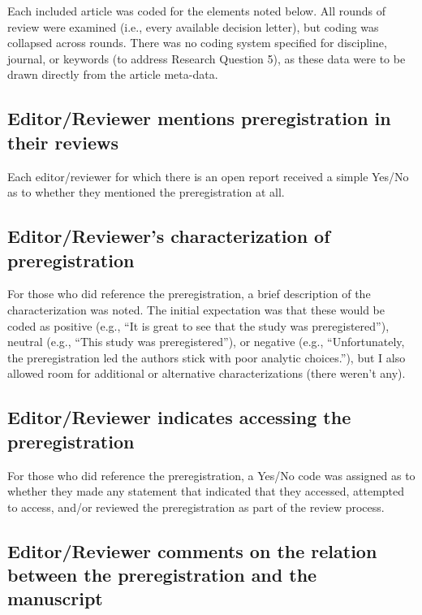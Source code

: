 \documentclass[authordate, empirical]{jote-new-article}
\begin{document}
	Each included article was coded for the elements noted below. All rounds of review were examined (i.e., every available decision letter), but coding was collapsed across rounds. There was no coding system specified for discipline, journal, or keywords (to address Research Question 5), as these data were to be drawn directly from the article meta-data.



	\subsection{Editor/Reviewer mentions preregistration in their reviews}



	Each editor/reviewer for which there is an open report received a simple Yes/No as to whether they mentioned the preregistration at all.



	\subsection{Editor/Reviewer's characterization of preregistration}



	For those who did reference the preregistration, a brief description of the characterization was noted. The initial expectation was that these would be coded as positive (e.g., “It is great to see that the study was preregistered”), neutral (e.g., “This study was preregistered”), or negative (e.g., “Unfortunately, the preregistration led the authors stick with poor analytic choices.”), but I also allowed room for additional or alternative characterizations (there weren't any).



	\subsection{Editor/Reviewer indicates accessing the preregistration }



	For those who did reference the preregistration, a Yes/No code was assigned as to whether they made any statement that indicated that they accessed, attempted to access, and/or reviewed the preregistration as part of the review process.



	\subsection{Editor/Reviewer comments on the relation between the preregistration and the manuscript}
\end{document}

